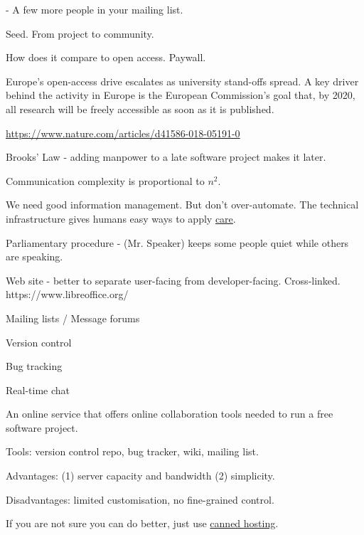 \documentclass[landscape,30pt]{foils}
\begin{document}
- A few more people in your mailing list.

Seed.  From project to community.


How does it compare to open access.  Paywall.

Europe’s open-access drive escalates as university stand-offs spread.  A key driver behind the activity in Europe is the European Commission’s goal that, by 2020, all research will be freely accessible as soon as it is published.

\url{https://www.nature.com/articles/d41586-018-05191-0}


Brooks' Law - adding manpower to a late software project makes it later. 

Communication complexity is proportional to $n^2$.

We need good information management.  But don't over-automate. The technical infrastructure gives humans easy ways to apply \underline{care}.

Parliamentary procedure -  (Mr. Speaker) keeps some people quiet while others are speaking.


Web site - better to separate user-facing from developer-facing. Cross-linked.  https://www.libreoffice.org/

Mailing lists / Message forums

Version control

Bug tracking

Real-time chat



An online service that offers online collaboration tools needed to run a free software project.

Tools: version control repo, bug tracker,  wiki, mailing list.

Advantages:  (1) server capacity and bandwidth (2) simplicity.

Disadvantages: limited customisation, no fine-grained control.
 
If you are not sure you can do better, just use \underline{canned hosting}.
\end{document}
